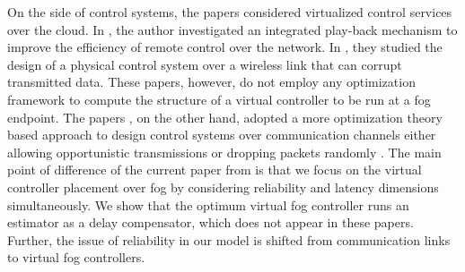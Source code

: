 \documentclass[10pt, journal, letterpaper]{IEEEtran}
\newcommand{\1}{\ensuremath{\mathbf{1}}} %
\begin{document}
On the side of control systems, the papers \cite{Abdelaal17, Vick16} considered virtualized control services over the cloud. In \cite{Liberatore2006Integrated}, the author investigated an integrated play-back mechanism to improve the efficiency of remote control over the network. In \cite{Ploplys2004Closed}, they studied the design of a physical control system over a wireless link that can corrupt transmitted data. These papers, however, do not employ any optimization framework to compute the structure of a virtual controller to be run at a fog endpoint. The papers \cite{Gatsis2015Control, Pappas15, Yuksel06, Gupta07}, on the other hand, adopted a more optimization theory based approach to design control systems over communication channels either allowing opportunistic transmissions \cite{Gatsis2015Control, Pappas15} or dropping packets randomly \cite{Yuksel06, Gupta07}. The main point of difference of the current paper from \cite{Gatsis2015Control, Pappas15, Yuksel06, Gupta07} is that we focus on the virtual controller placement over fog by considering reliability and latency dimensions simultaneously. We show that the optimum virtual fog controller runs an estimator as a delay compensator, which does not appear in these papers. Further, the issue of reliability in our model is shifted from communication links to virtual fog controllers. %



\end{document}
